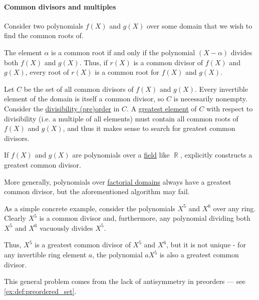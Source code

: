 \paragraph{Common divisors and multiples}

\begin{example}\label{ex:common_polynomial_divisors}
  Consider two polynomials \( f(X) \) and \( g(X) \) over some domain that we wish to find the common roots of.

  The element \( \alpha \) is a common root if and only if the polynomial \( (X - \alpha) \) divides both \( f(X) \) and \( g(X) \). Thus, if \( r(X) \) is a common divisor of \( f(X) \) and \( g(X) \), every root of \( r(X) \) is a common root for \( f(X) \) and \( g(X) \).

  Let \( C \) be the set of all common divisors of \( f(X) \) and \( g(X) \). Every invertible element of the domain is itself a common divisor, so \( C \) is necessarily nonempty. Consider the \hyperref[thm:semiring_divisibility_order]{divisibility (pre)order} in \( C \). A \hyperref[def:extremal_points/maximum_and_minimum]{greatest element} of \( C \) with respect to divisibility (i.e. a multiple of all elements) must contain all common roots of \( f(X) \) and \( g(X) \), and thus it makes sense to search for greatest common divisors.

  \begin{thmenum}
     If \( f(X) \) and \( g(X) \) are polynomials over a \hyperref[def:field]{field} like \( \BbbR \),  explicitly constructs a greatest common divisor.

     More generally, polynomials over \hyperref[def:factorial_domain]{factorial domains} always have a greatest common divisor, but the aforementioned algorithm may fail.

     As a simple concrete example, consider the polynomials \( X^5 \) and \( X^6 \) over any ring. Clearly \( X^5 \) is a common divisor and, furthermore, any polynomial dividing both \( X^5 \) and \( X^6 \) vacuously divides \( X^5 \).

    Thus, \( X^5 \) is a greatest common divisor of \( X^5 \) and \( X^6 \), but it is not unique - for any invertible ring element \( a \), the polynomial \( a X^5 \) is also a greatest common divisor.

    This general problem comes from the lack of antisymmetry in preorders --- see \cref{ex:def:preordered_set}.


\end{thmenum}
\end{example}
